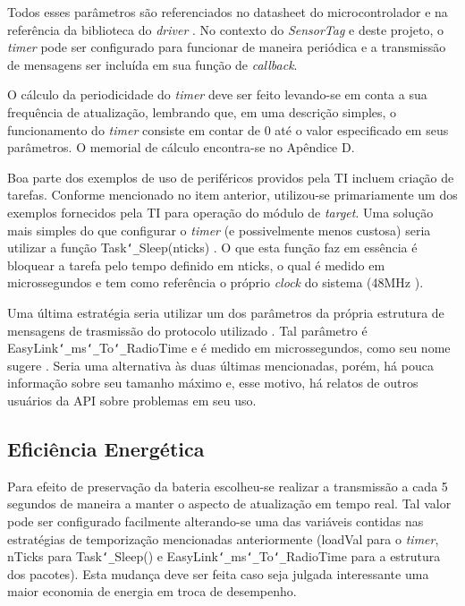Todos esses parâmetros são referenciados no datasheet do microcontrolador \cite{datasheet} e na referência da biblioteca do \emph{driver} \cite{gptimer}. No contexto do \emph{SensorTag} e deste projeto, o \emph{timer} pode ser configurado para funcionar de maneira periódica e a transmissão de mensagens ser incluída em sua função de \emph{callback}.

O cálculo da periodicidade do \emph{timer} deve ser feito levando-se em conta a sua frequência de atualização, lembrando que, em uma descrição simples, o funcionamento do \emph{timer} consiste em contar de 0 até o valor especificado em seus parâmetros. O memorial de cálculo encontra-se no Apêndice D.

Boa parte dos exemplos de uso de periféricos providos pela TI incluem criação de tarefas. Conforme mencionado no item anterior, utilizou-se primariamente um dos exemplos fornecidos pela TI para operação do módulo de \emph{target}. Uma solução mais simples do que configurar o \emph{timer} (e possivelmente menos custosa) seria utilizar a função Task\texttt{\char`_}Sleep(nticks) \cite{task-modules}. O que esta função faz em essência é bloquear a tarefa pelo tempo definido em nticks, o qual é medido em microssegundos e tem como referência o próprio \emph{clock} do sistema (48MHz \cite{datasheet}).

Uma última estratégia seria utilizar um dos parâmetros da própria estrutura de mensagens de trasmissão do protocolo utilizado \cite{forum-easylink}. Tal parâmetro é EasyLink\texttt{\char`_}ms\texttt{\char`_}To\texttt{\char`_}RadioTime e é medido em microssegundos, como seu nome sugere \cite{easylink}. Seria uma alternativa às duas últimas mencionadas, porém, há pouca informação sobre seu tamanho máximo e, esse motivo, há relatos de outros usuários da API sobre problemas em seu uso.

\subsection{Eficiência Energética}

Para efeito de preservação da bateria escolheu-se realizar a transmissão a cada 5 segundos de maneira a manter o aspecto de atualização em tempo real. Tal valor pode ser configurado facilmente alterando-se uma das variáveis contidas nas estratégias de temporização mencionadas anteriormente (loadVal para o \emph{timer}, nTicks para Task\texttt{\char`_}Sleep() e EasyLink\texttt{\char`_}ms\texttt{\char`_}To\texttt{\char`_}RadioTime para a estrutura dos pacotes). Esta mudança deve ser feita caso seja julgada interessante uma maior economia de energia em troca de desempenho.

